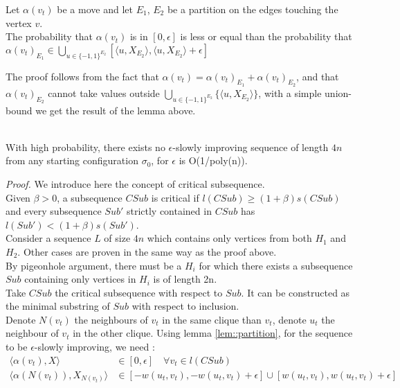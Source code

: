 \begin{lemma}
\label{lem::partition}
Let $\alpha(v_t)$ be a move and let $E_1$, $E_2$ be a partition on the edges touching the vertex $v$. \\
The probability that $\alpha(v_t)$ is in $[0, \epsilon]$ is less or equal than the probability that $\alpha(v_t)_{E_1} \in \bigcup_{u \in \{-1, 1 \}^{E_2}} [\langle u, X_{E_2}\rangle , \langle u, X_{E_2}\rangle + \epsilon]$
\end{lemma}

The proof follows from the fact that $\alpha(v_t) = \alpha(v_t)_{E_1} + \alpha(v_t)_{E_2}$, and that $\alpha(v_t)_{E_2}$ cannot take values outside $\bigcup_{u \in \{-1, 1 \}^{E_2}}\{\langle u, X_{E_2}\rangle\}$, with a simple union-bound we get the result of the lemma above.\\

\begin{proposition}
\leavevmode \\
With high probability, there exists no $\epsilon$-slowly improving sequence of length $4n$ from any starting configuration $\sigma_0$, for $\epsilon$ is O(1/poly(n)).
\end{proposition}

\textit{Proof. }
We introduce here the concept of critical subsequence. \\
Given $\beta > 0$, a subsequence $CSub$ is critical if $l(CSub) \geq (1 + \beta)s(CSub)$ and every subsequence $Sub'$ strictly contained in $CSub$ has $l(Sub') < (1+\beta)s(Sub')$. \\
Consider a sequence $L$ of size $4n$ which contains only vertices from both $H_1$ and $H_2$. 
Other cases are proven in the same way as the proof above. \\
By pigeonhole argument, there must be a $H_i$ for which there exists a subsequence $Sub$ containing only vertices in $H_i$ is of length 2n. \\
Take $CSub$ the critical subsequence with respect to $Sub$. It can be constructed as the minimal substring of $Sub$ with respect to inclusion.\\
Denote $N(v_t)$ the neighbours of $v_t$ in the same clique than $v_t$, denote $u_t$ the neighbour of $v_t$ in the other clique.
Using lemma \ref{lem::partition}, for the sequence to be $\epsilon$-slowly improving, we need :
\begin{equation*}
\begin{split}
\langle \alpha(v_t), X \rangle &\in [0, \epsilon] \quad \forall v_t \in l(CSub) \\
\langle \alpha(N(v_t)), X_{N(v_t)}\rangle &\in [-w(u_t,v_t), -w(u_t,v_t) + \epsilon] \cup [w(u_t,v_t), w(u_t,v_t) + \epsilon]
\end{split}
\end{equation*}

